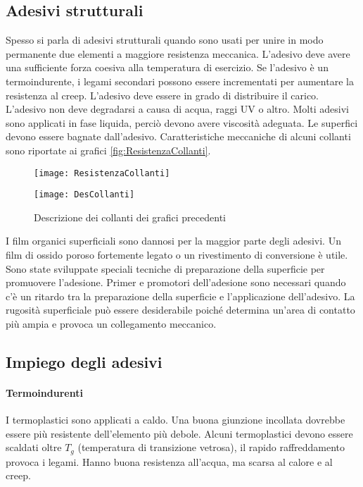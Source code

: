 \subsection{Adesivi strutturali}
Spesso si parla di adesivi strutturali quando sono usati per unire in modo permanente due elementi a maggiore resistenza meccanica.
L'adesivo deve avere una sufficiente forza coesiva alla temperatura  di esercizio.
Se l'adesivo è un termoindurente, i legami secondari possono essere incrementati per aumentare la resistenza al creep.
L'adesivo deve essere in grado di distribuire il carico.
L'adesivo non deve degradarsi a causa di acqua, raggi UV o altro.
Molti adesivi sono applicati in fase liquida, perciò devono avere viscosità adeguata.
Le superfici devono essere bagnate dall'adesivo.
Caratteristiche meccaniche di alcuni collanti sono riportate ai grafici \ref{fig:ResistenzaCollanti}.

\begin{figure}
\centering
\texttt{[image: ResistenzaCollanti]}
\caption{Diagrammi di resistenza meccanica di alcuni collanti, la descrizione dei collanti è riportato alla figura successiva \ref{fig:DesCollanti}}
\label{fig:ResistenzaCollanti}
\texttt{[image: DesCollanti]}
\caption{Descrizione dei collanti dei grafici precedenti}
\label{fig:DesCollanti}
\end{figure}

I film organici superficiali sono dannosi per la maggior parte degli adesivi. Un film di ossido poroso fortemente legato o un rivestimento di conversione è utile.
Sono state sviluppate speciali tecniche di preparazione della superficie per promuovere l'adesione.
Primer e promotori dell'adesione sono necessari quando c'è un ritardo tra la preparazione della superficie e l'applicazione dell'adesivo.
La rugosità superficiale può essere desiderabile poiché determina un'area di contatto più ampia e provoca un collegamento meccanico.

\subsection{Impiego degli adesivi}
\paragraph{Termoindurenti}
I termoplastici sono applicati a caldo.
Una buona giunzione incollata dovrebbe essere più resistente dell'elemento più debole.
Alcuni termoplastici devono essere scaldati oltre $T_g$ (temperatura di transizione vetrosa), il rapido raffreddamento provoca i legami.
Hanno buona resistenza all'acqua, ma scarsa al calore e al creep.

